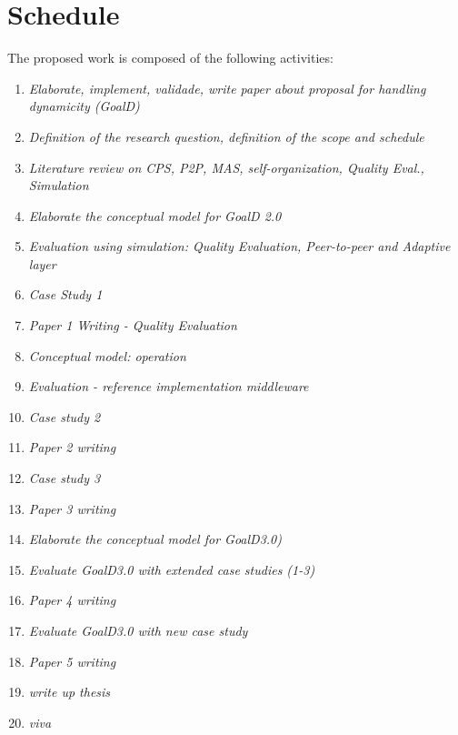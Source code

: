 \section{Schedule}
\label{chap:schedule}

The proposed work is composed of the following activities:

\begin{enumerate}
\item \emph{Elaborate, implement, validade, write paper about proposal for handling dynamicity (GoalD)}
\item \emph{Definition of the research question, definition of the scope and schedule}

\item \emph{Literature review on CPS, P2P, MAS, self-organization, Quality Eval., Simulation}
\item \emph{Elaborate the conceptual model for GoalD 2.0}
\item \emph{Evaluation using simulation: Quality Evaluation, Peer-to-peer and Adaptive layer}
\item \emph{Case Study 1}
\item \emph{Paper 1 Writing - Quality Evaluation}

\item \emph{Conceptual model: operation}
\item \emph{Evaluation - reference implementation middleware}
\item \emph{Case study 2}
\item \emph{Paper 2 writing}
\item \emph{Case study 3}
\item \emph{Paper 3 writing}

\item \emph{Elaborate the conceptual model for GoalD3.0)}
\item \emph{Evaluate GoalD3.0 with extended case studies (1-3)}
\item \emph{Paper 4 writing}
\item \emph{Evaluate GoalD3.0 with new case study}
\item \emph{Paper 5 writing}

\item \emph{write up thesis}
\item \emph{viva}


\end{enumerate}

